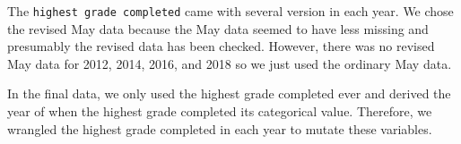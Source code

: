 \documentclass{article}
\newenvironment{Shaded}{\begin{snugshade}}{\end{snugshade}}
\newcommand{\CommentTok}[1]{\textcolor[rgb]{0.56,0.35,0.01}{\textit{#1}}}
\newcommand{\DataTypeTok}[1]{\textcolor[rgb]{0.13,0.29,0.53}{#1}}
\newcommand{\DecValTok}[1]{\textcolor[rgb]{0.00,0.00,0.81}{#1}}
\newcommand{\KeywordTok}[1]{\textcolor[rgb]{0.13,0.29,0.53}{\textbf{#1}}}
\newcommand{\NormalTok}[1]{#1}
\newcommand{\OperatorTok}[1]{\textcolor[rgb]{0.81,0.36,0.00}{\textbf{#1}}}
\newcommand{\StringTok}[1]{\textcolor[rgb]{0.31,0.60,0.02}{#1}}
\begin{document}
The \texttt{highest\ grade\ completed} came with several version in each
year. We chose the revised May data because the May data seemed to have
less missing and presumably the revised data has been checked. However,
there was no revised May data for 2012, 2014, 2016, and 2018 so we just
used the ordinary May data.

\begin{Shaded}
\end{Shaded}

In the final data, we only used the highest grade completed ever and
derived the year of when the highest grade completed its categorical
value. Therefore, we wrangled the highest grade completed in each year
to mutate these variables.
\end{document}
